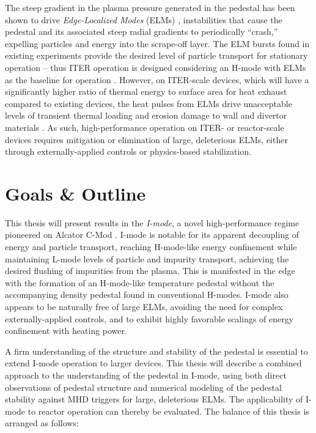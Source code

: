 The steep gradient in the plasma pressure generated in the pedestal has been shown to drive \emph{Edge-Localized Modes} (ELMs) \cite{Zohm1996}, instabilities that cause the pedestal and its associated steep radial gradients to periodically ``crash,'' expelling particles and energy into the scrape-off layer.  The ELM bursts found in existing experiments provide the desired level of particle transport for stationary operation -- thus ITER operation is designed considering an H-mode with ELMs as the baseline for operation \cite{ITER1999,Shimada2007}.  However, on ITER-scale devices, which will have a significantly higher ratio of thermal energy to surface area for heat exhaust compared to existing devices, the heat pulses from ELMs drive unacceptable levels of transient thermal loading and erosion damage to wall and divertor materials \cite{Loarte2003,Federici2003}.  As such, high-performance operation on ITER- or reactor-scale devices requires mitigation or elimination of large, deleterious ELMs, either through externally-applied controls or physics-based stabilization.\nicesectionending


\section{Goals \& Outline}\label{sec:intro_outline}

This thesis will present results in the \emph{I-mode}, a novel high-performance regime pioneered on Alcator C-Mod \cite{Whyte2010}.  I-mode is notable for its apparent decoupling of energy and particle transport, reaching H-mode-like energy confinement while maintaining L-mode levels of particle and impurity transport, achieving the desired flushing of impurities from the plasma.  This is manifested in the edge with the formation of an H-mode-like temperature pedestal without the accompanying density pedestal found in conventional H-modes.  I-mode also appears to be naturally free of large ELMs, avoiding the need for complex externally-applied controls, and to exhibit highly favorable scalings of energy confinement with heating power.

A firm understanding of the structure and stability of the pedestal is essential to extend I-mode operation to larger devices.  This thesis will describe a combined approach to the understanding of the pedestal in I-mode, using both direct observations of pedestal structure and numerical modeling of the pedestal stability against MHD triggers for large, deleterious ELMs.  The applicability of I-mode to reactor operation can thereby be evaluated.  The balance of this thesis is arranged as follows:

